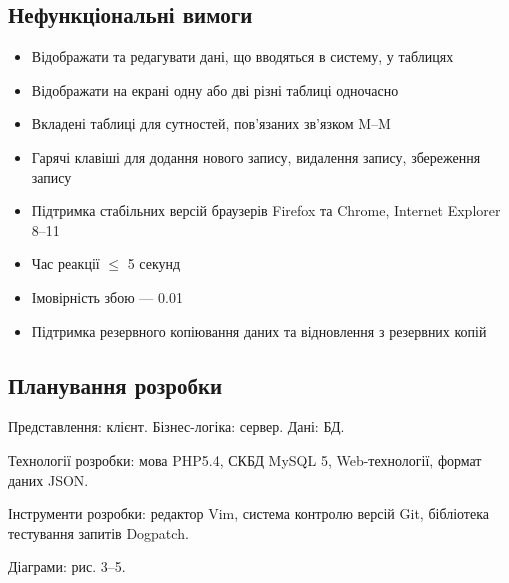\subsection{Нефункціональні вимоги}
\begin{itemize}
 \item Відображати та редагувати дані, що вводяться в систему, у таблицях
 \item Відображати на екрані одну або дві різні таблиці одночасно
 \item Вкладені таблиці для сутностей, пов'язаних зв'язком M--M
 \item Гарячі клавіші для додання нового запису, видалення запису, збереження запису
 \item Підтримка стабільних версій браузерів Firefox та Chrome, Internet Explorer 8--11
 \item Час реакції $\leqslant$ 5 секунд
 \item Імовірність збою --- 0.01
 \item Підтримка резервного копіювання даних та відновлення з резервних копій
\end{itemize}

\subsection{Планування розробки}
Представлення: клієнт. Бізнес-логіка: сервер. Дані: БД.

Технології розробки: мова PHP5.4, СКБД MySQL 5, Web-технології, формат даних JSON.

Інструменти розробки: редактор Vim, система контролю версій Git, бібліотека тестування запитів Dogpatch.

Діаграми: рис. 3--5.

